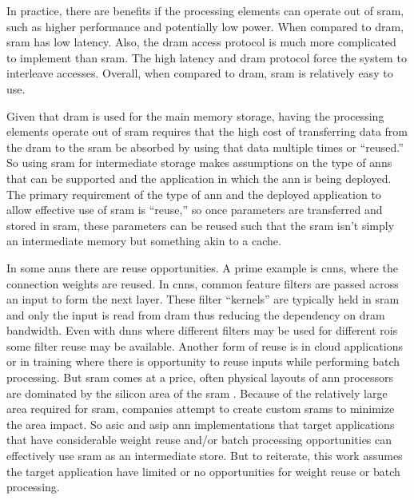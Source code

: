 In practice, there are benefits if the processing elements can operate out of \ac{sram}, such as higher performance and potentially low power. 
When compared to \ac{dram}, \ac{sram} has low latency. Also, the \ac{dram} access protocol is much more complicated to implement than \ac{sram}. 
The high latency and \ac{dram} protocol force the system to interleave accesses. Overall, when compared to \ac{dram}, \ac{sram} is relatively easy to use.

Given that \ac{dram} is used for the main memory storage, having the processing elements operate out of \ac{sram} requires that the high cost of transferring data from the \ac{dram} to the \ac{sram} be absorbed by using that data multiple times or ``reused.''
So using \ac{sram} for intermediate storage makes assumptions on the type of \acp{ann} that can be supported and the application in which the \ac{ann} is being deployed.
The primary requirement of the type of \ac{ann} and the deployed application to allow effective use of \ac{sram} is ``reuse,'' so once parameters are transferred and stored in \ac{sram}, these parameters can be reused such that the \ac{sram} isn't simply an intermediate memory but something akin to a cache.

In some \ac{ann}s there are reuse opportunities. 
A prime example is \acp{cnn}, where the connection weights are reused. In \acp{cnn}, common feature filters are passed across an input to form the next layer. 
These filter ``kernels'' are typically held in \ac{sram} and only the input is read from \ac{dram} thus reducing the dependency on \ac{dram} bandwidth.
Even with \ac{dnn}s where different filters may be used for different \acp{roi} some filter reuse may be available.
Another form of reuse is in cloud applications or in training where there is opportunity to reuse inputs while performing batch processing.
But \ac{sram} comes at a price, often physical layouts of \ac{ann} processors are dominated by the silicon area of the \ac{sram} \cite{chen2014diannao}\cite{jouppi2017datacenter}\cite{kim2016neurocube}. 
Because of the relatively large area required for \ac{sram}, companies attempt to create custom \acp{sram} to minimize the area impact.
So \ac{asic} and \ac{asip} \ac{ann} implementations that target applications that have considerable weight reuse and/or batch processing opportunities can effectively use \ac{sram} as an intermediate store.
But to reiterate, this work assumes the target application have limited or no opportunities for weight reuse or batch processing.

